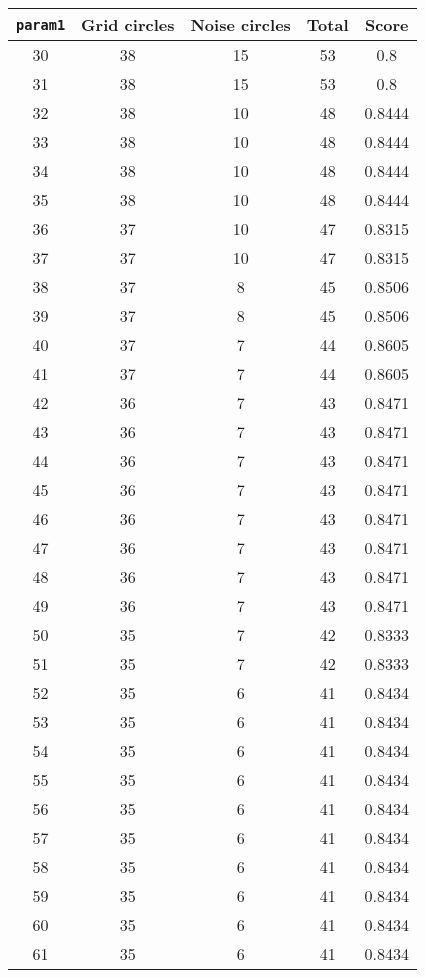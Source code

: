 \documentclass[letterpaper, 12pt]{article}
\begin{document}
\begin{longtable}{|c|c|c|c|c|}
\hline
\textbf{\texttt{param1}} & \textbf{Grid circles} & \textbf{Noise circles} & \textbf{Total} & \textbf{Score} \\
\hline
30 & 38 & 15 & 53 & 0.8 \\
\hline
31 & 38 & 15 & 53 & 0.8 \\
\hline
32 & 38 & 10 & 48 & 0.8444 \\
\hline
33 & 38 & 10 & 48 & 0.8444 \\
\hline
34 & 38 & 10 & 48 & 0.8444 \\
\hline
35 & 38 & 10 & 48 & 0.8444 \\
\hline
36 & 37 & 10 & 47 & 0.8315 \\
\hline
37 & 37 & 10 & 47 & 0.8315 \\
\hline
38 & 37 & 8 & 45 & 0.8506 \\
\hline
39 & 37 & 8 & 45 & 0.8506 \\
\hline
40 & 37 & 7 & 44 & 0.8605 \\
\hline
41 & 37 & 7 & 44 & 0.8605 \\
\hline
42 & 36 & 7 & 43 & 0.8471 \\
\hline
43 & 36 & 7 & 43 & 0.8471 \\
\hline
44 & 36 & 7 & 43 & 0.8471 \\
\hline
45 & 36 & 7 & 43 & 0.8471 \\
\hline
46 & 36 & 7 & 43 & 0.8471 \\
\hline
47 & 36 & 7 & 43 & 0.8471 \\
\hline
48 & 36 & 7 & 43 & 0.8471 \\
\hline
49 & 36 & 7 & 43 & 0.8471 \\
\hline
50 & 35 & 7 & 42 & 0.8333 \\
\hline
51 & 35 & 7 & 42 & 0.8333 \\
\hline
52 & 35 & 6 & 41 & 0.8434 \\
\hline
53 & 35 & 6 & 41 & 0.8434 \\
\hline
54 & 35 & 6 & 41 & 0.8434 \\
\hline
55 & 35 & 6 & 41 & 0.8434 \\
\hline
56 & 35 & 6 & 41 & 0.8434 \\
\hline
57 & 35 & 6 & 41 & 0.8434 \\
\hline
58 & 35 & 6 & 41 & 0.8434 \\
\hline
59 & 35 & 6 & 41 & 0.8434 \\
\hline
60 & 35 & 6 & 41 & 0.8434 \\
\hline
61 & 35 & 6 & 41 & 0.8434 \\

\end{longtable}
\end{document}
